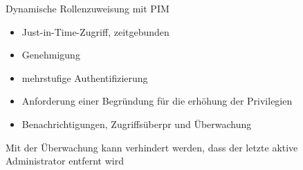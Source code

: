 \begin{flashcard}[Definition]{Dynamische Rollenzuweisung mit PIM}
  \begin{itemize}
    \item Just-in-Time-Zugriff, zeitgebunden
    \item Genehmigung
    \item mehrstufige Authentifizierung
    \item Anforderung einer Begründung für die erhöhung der Privilegien
    \item Benachrichtigungen, Zugriffsüberpr und Überwachung
  \end{itemize}
  Mit der Überwachung kann verhindert werden, dass der letzte aktive Administrator entfernt wird
\end{flashcard}

